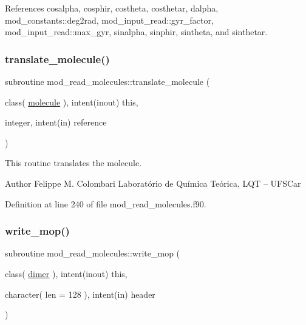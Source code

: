 References cosalpha, cosphir, costheta, costhetar, dalpha, mod\+\_\+constants\+::deg2rad, mod\+\_\+input\+\_\+read\+::gyr\+\_\+factor, mod\+\_\+input\+\_\+read\+::max\+\_\+gyr, sinalpha, sinphir, sintheta, and sinthetar.

\mbox{\label{namespacemod__read__molecules_a516f16861094339983ebcd9af3fedbaa}} 
\subsubsection{\texorpdfstring{translate\+\_\+molecule()}{translate\_molecule()}}
{\footnotesize\ttfamily subroutine mod\+\_\+read\+\_\+molecules\+::translate\+\_\+molecule (\begin{DoxyParamCaption}\item[{class( \hyperlink{structmod__read__molecules_1_1molecule}{molecule} ), intent(inout)}]{this,  }\item[{integer, intent(in)}]{reference }\end{DoxyParamCaption})}



This routine translates the molecule. 

\begin{DoxyAuthor}{Author}
Felippe M. Colombari Laboratório de Química Teórica, L\+QT -- U\+F\+S\+Car 
\end{DoxyAuthor}


Definition at line 240 of file mod\+\_\+read\+\_\+molecules.\+f90.

\mbox{\label{namespacemod__read__molecules_a79baec2daf0d11f0bd50d405874d4186}} 
\subsubsection{\texorpdfstring{write\+\_\+mop()}{write\_mop()}}
{\footnotesize\ttfamily subroutine mod\+\_\+read\+\_\+molecules\+::write\+\_\+mop (\begin{DoxyParamCaption}\item[{class( \hyperlink{structmod__read__molecules_1_1dimer}{dimer} ), intent(inout)}]{this,  }\item[{character( len = 128 ), intent(in)}]{header }\end{DoxyParamCaption})}



